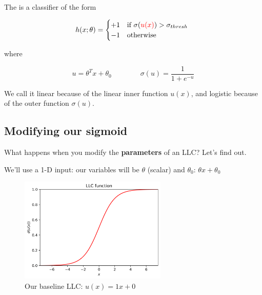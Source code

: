         \begin{kequation}
            The  is a  classifier of the form
            
            \begin{equation*}
                h(x; \theta) = 
                \begin{cases}
                    +1 & \text{if $\sigma(\textcolor{red}{u(x)})>\sigma_{thresh}$ }\\
                    -1 & \text{otherwise}
                \end{cases}
            \end{equation*}
            
            where 
            
            \begin{equation*}
                u=\theta^T x + \theta_0   \qquad\qquad \sigma(u) = \frac{1}{1+e^{-u}}
            \end{equation*}
            
            We call it linear because of the linear inner function $u(x)$, and logistic because of the outer function $\sigma(u)$.
        \end{kequation}
        
    \subsection{Modifying our sigmoid}
    
        What happens when you modify the \textbf{parameters} of an LLC? Let's find out.
        
        We'll use a 1-D input: our variables will be $\theta$ (scalar) and $\theta_0$: $\theta x + \theta_0$
        
        \begin{figure}[H]
            \centering
            \includegraphics[width=70mm,scale=0.5]{images/classification_images/llc_func.png}
            \caption*{Our baseline LLC: $u(x)=1x+0 $}
        \end{figure}
        
